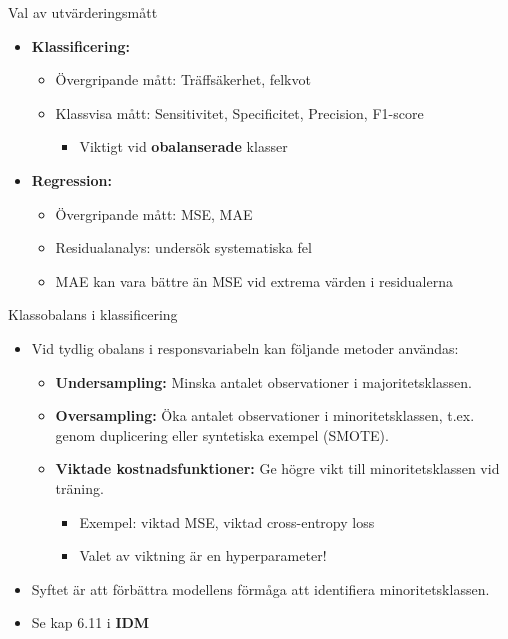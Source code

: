 \documentclass[10pt,english]{beamer}
\begin{document}
\begin{frame}{Val av utvärderingsmått}
\begin{itemize}
    \item \textbf{Klassificering:}
    \begin{itemize}
        \item Övergripande mått: Träffsäkerhet, felkvot
        \item Klassvisa mått: Sensitivitet, Specificitet, Precision, F1-score
        \begin{itemize}
          \item Viktigt vid \textbf{obalanserade} klasser
        \end{itemize}
    \end{itemize}
    \item \textbf{Regression:}
    \begin{itemize}
        \item Övergripande mått: MSE, MAE 
        \item Residualanalys: undersök systematiska fel
        \item MAE kan vara bättre än MSE vid extrema värden i residualerna
    \end{itemize}
\end{itemize}
\end{frame}

\begin{frame}{Klassobalans i klassificering}
\begin{itemize}
    \item Vid tydlig obalans i responsvariabeln kan följande metoder användas:
    \begin{itemize}
        \item \textbf{Undersampling:} Minska antalet observationer i majoritetsklassen.
        \item \textbf{Oversampling:} Öka antalet observationer i minoritetsklassen, t.ex. genom duplicering eller syntetiska exempel (SMOTE).
        \item \textbf{Viktade kostnadsfunktioner:} Ge högre vikt till minoritetsklassen vid träning.
        \begin{itemize}
            \item Exempel: viktad MSE, viktad cross-entropy loss
            \item Valet av viktning är en hyperparameter!
        \end{itemize}
    \end{itemize}
    \item Syftet är att förbättra modellens förmåga att identifiera minoritetsklassen.
    \item Se kap 6.11 i \textbf{IDM}
\end{itemize}
\end{frame}
\end{document}
